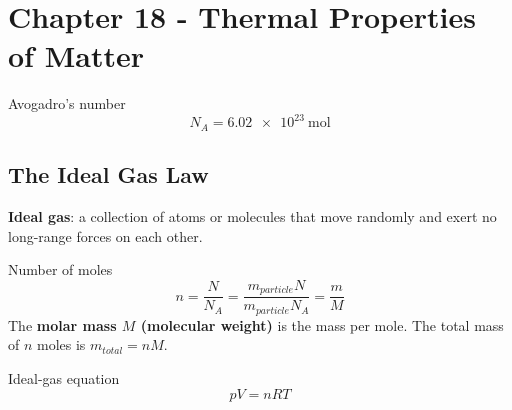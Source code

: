 \documentclass{article}
\begin{document}
\newcommand{\hr}{\par\noindent\rule{\textwidth}{0.4pt}}

\newcommand{\bc}[1]{
	\begin{equation*}
		\begin{boxed}
			{#1}
		\end{boxed}
	\end{equation*}
}

\newcommand{\cond}[2]{
	\ifmmode
		{#1} \quad {#2}
	\else
		$$ {#1} \quad {#2} $$
	\fi
}

\newcommand{\matr}[1]{
	\ifmmode \bm{#1}
	\else \textit{\textbf{#1}}
	\fi
}
\newcommand{\vect}[1]{
	\ifmmode \mathbf{#1}
	\else \textbf{#1}
	\fi
}

\newcommand{\boldalph}{\textbf{(\alph*)}}


\tableofcontents

\section{Chapter 18 - Thermal Properties of Matter}

Avogadro's number
\begin{equation}
	N_A = \SI{6.02e23}{\mole}
\end{equation}

\subsection{The Ideal Gas Law}

\textbf{Ideal gas}: a collection of atoms or molecules that move randomly and exert no long-range forces on each other.

Number of moles
\begin{equation}
	n = \frac{ N }{ N_A } = \frac{ m_{particle}N }{ m_{particle}N_A } = \frac{ m }{ M }
\end{equation}
The \textbf{molar mass $ M $ (molecular weight)} is the mass per mole. The total mass of $ n $ moles is $ m_{total} = nM $.

Ideal-gas equation
\begin{equation}
	pV = nRT
\end{equation}
\end{document}

